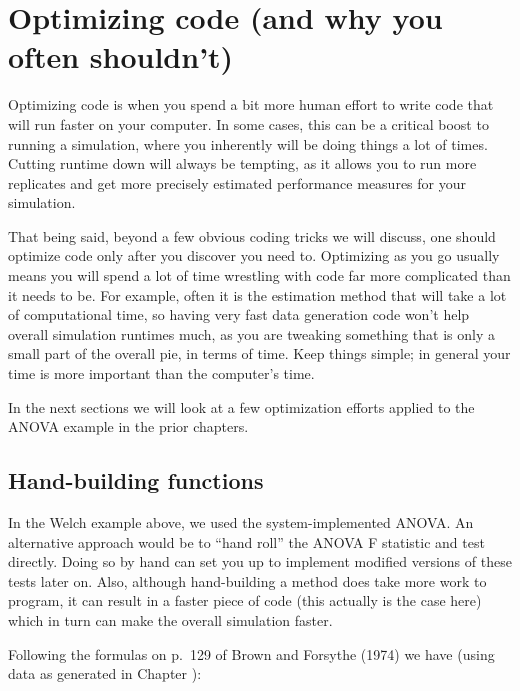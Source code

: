 \documentclass[
]{book}
\begin{document}
\hypertarget{optimize_code}{%
\chapter{Optimizing code (and why you often shouldn't)}\label{optimize_code}}

Optimizing code is when you spend a bit more human effort to write code that will run faster on your computer.
In some cases, this can be a critical boost to running a simulation, where you inherently will be doing things a lot of times.
Cutting runtime down will always be tempting, as it allows you to run more replicates and get more precisely estimated performance measures for your simulation.

That being said, beyond a few obvious coding tricks we will discuss, one should optimize code only after you discover you need to.
Optimizing as you go usually means you will spend a lot of time wrestling with code far more complicated than it needs to be.
For example, often it is the estimation method that will take a lot of computational time, so having very fast data generation code won't help overall simulation runtimes much, as you are tweaking something that is only a small part of the overall pie, in terms of time.
Keep things simple; in general your time is more important than the computer's time.

In the next sections we will look at a few optimization efforts applied to the ANOVA example in the prior chapters.

\hypertarget{hand-building-functions}{%
\section{Hand-building functions}\label{hand-building-functions}}

In the Welch example above, we used the system-implemented ANOVA.
An alternative approach would be to ``hand roll'' the ANOVA F statistic and test directly.
Doing so by hand can set you up to implement modified versions of these tests later on.
Also, although hand-building a method does take more work to program, it can result in a faster piece of code (this actually is the case here) which in turn can make the overall simulation faster.

Following the formulas on p.~129 of Brown and Forsythe (1974) we have (using data as generated in Chapter \citet{chap_DGP}):
\end{document}
